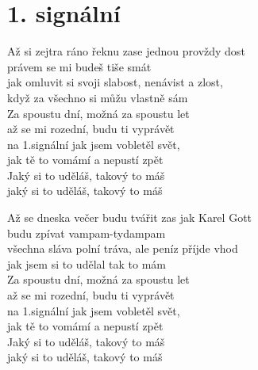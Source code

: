 \section{1. signální}
\onehalfspacing

Až si  zejtra ráno řeknu zase  jednou provždy dost\\
právem se mi budeš tiše smát\\
jak omluvit si svoji slabost, nenávist a zlost,\\
když za všechno si můžu vlastně sám\\

Za  spoustu dní, možná za spoustu let\\
až se mi rozední, budu ti vyprávět\\
na 1.signální jak jsem vobletěl svět,\\
jak tě to vomámí a nepustí zpět\\
Jaký si to uděláš, takový to máš\\
jaký si to uděláš, takový to máš\\

\singlespacing

\sloka{}
Až se dneska večer budu tvářit zas jak Karel Gott\\
budu zpívat vampam-tydampam\\
všechna sláva polní tráva, ale peníz příjde vhod\\
jak jsem si to udělal tak to mám\\

Za  spoustu dní, možná za spoustu let\\
až se mi rozední, budu ti vyprávět\\
na 1.signální jak jsem vobletěl svět,\\
jak tě to vomámí a nepustí zpět\\
Jaký si to uděláš, takový to máš\\
jaký si to uděláš, takový to máš\\


